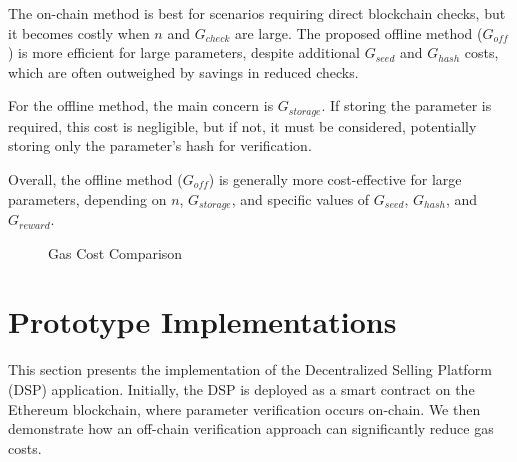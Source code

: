 \documentclass[runningheads]{llncs}
\begin{document}
The on-chain method is best for scenarios requiring direct blockchain checks, but it becomes costly when \( n \) and \( G_{check} \) are large. The proposed offline method (\( G_{off} \)) is more efficient for large parameters, despite additional \( G_{seed} \) and \( G_{hash} \) costs, which are often outweighed by savings in reduced checks.

For the offline method, the main concern is \( G_{storage} \). If storing the parameter is required, this cost is negligible, but if not, it must be considered, potentially storing only the parameter's hash for verification.

Overall, the offline method (\( G_{off} \)) is generally more cost-effective for large parameters, depending on \( n \), \( G_{storage} \), and specific values of \( G_{seed} \), \( G_{hash} \), and \( G_{reward} \).
\begin{figure}
  \centering
  \caption{Gas Cost Comparison}
  \label{fig:gas_compare}
\end{figure}
\section{Prototype Implementations}
\label{sec:prototype-implementation}
This section presents the implementation of the Decentralized Selling Platform (DSP) application. Initially, the DSP is deployed as a smart contract on the Ethereum blockchain, where parameter verification occurs on-chain. We then demonstrate how an off-chain verification approach can significantly reduce gas costs.
\end{document}
